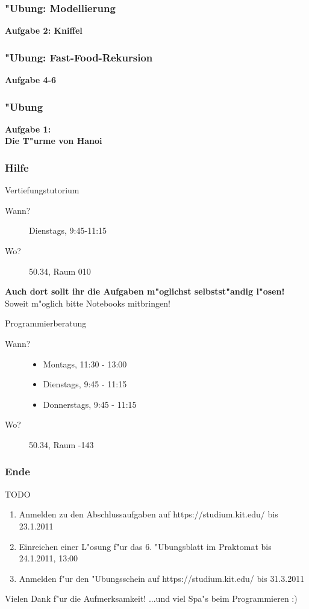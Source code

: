 \documentclass{beamer}
\begin{document}
\begin{frame}
\frametitle{"Ubung: Modellierung}
\begin{center}
\textbf{\Huge Aufgabe 2: Kniffel}
\end{center}
\end{frame}


\begin{frame}
\frametitle{"Ubung: Fast-Food-Rekursion}
\begin{center}
\textbf{\Huge Aufgabe 4-6}
\end{center}
\end{frame}


\begin{frame}
\frametitle{"Ubung}
\begin{center}
\textbf{\Huge Aufgabe 1:\\Die T"urme von Hanoi}
\end{center}
\end{frame}


\begin{frame}
\frametitle{Hilfe}
\begin{block}{Vertiefungstutorium}
\begin{description}
\item[Wann?] Dienstags, 9:45-11:15
\item[Wo?] 50.34, Raum 010
\end{description}
\textbf{Auch dort sollt ihr die Aufgaben m"oglichst selbstst"andig l"osen!}
\alert{Soweit m"oglich bitte Notebooks mitbringen!}
\end{block}

\begin{block}{Programmierberatung}
\begin{description}
\item[Wann?]
\begin{itemize}
\item Montags, 11:30 - 13:00
\item Dienstags, 9:45 - 11:15
\item Donnerstags, 9:45 - 11:15
\end{itemize}
\item[Wo?] 50.34, Raum -143
\end{description}
\end{block}
\end{frame}


\begin{frame}
\frametitle{Ende}
\begin{block}{TODO}
\begin{enumerate}
\item Anmelden zu den Abschlussaufgaben auf https://studium.kit.edu/ bis \alert{23.1.2011}
\item Einreichen einer L"osung f"ur das 6. "Ubungsblatt im Praktomat bis \alert{24.1.2011, 13:00}
\item Anmelden f"ur den "Ubungsschein auf https://studium.kit.edu/ bis \alert{31.3.2011}
\end{enumerate}
\end{block}

\begin{block}{Vielen Dank f"ur die Aufmerksamkeit!}
...und viel Spa"s beim Programmieren :)
\end{block}
\end{frame}
\end{document}
